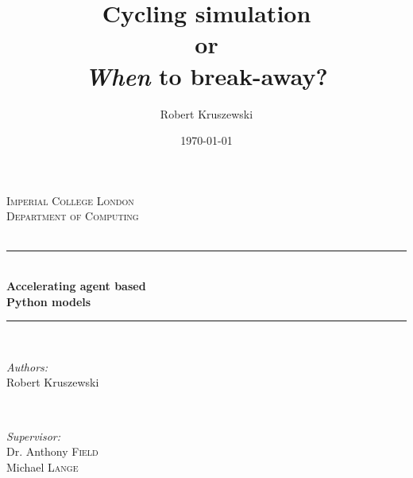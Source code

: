 \documentclass[10pt, a4paper]{report}
\title{Cycling simulation\\or\\\textit{When} to break-away?}
\date{\today}
\author{Robert Kruszewski}
\begin{document}
\begin{titlepage}

\newcommand{\HRule}{\rule{\linewidth}{0.5mm}} %

\center %


\textsc{\LARGE Imperial College London}\\[1.5cm] %
\textsc{\Large Department of Computing}\\[0.5cm] %
\textsc{\large}\\[0.5cm] %


\HRule \\[0.4cm]
{ \huge \bfseries Accelerating agent based\\\vspace{0.4cm}Python models}\\[0.4cm] %
\HRule \\[1.5cm]


\begin{minipage}{0.4\textwidth}
\begin{flushleft} \large
\emph{Authors:}\\
Robert Kruszewski\\
\end{flushleft}
\end{minipage}
~
\begin{minipage}{0.4\textwidth}
\begin{flushright} \large
\emph{Supervisor:} \\
Dr. Anthony \textsc{Field} \\%
Michael \textsc{Lange} \\%
\end{flushright}
\end{minipage}\\[5cm]


\end{titlepage}
\end{document}
